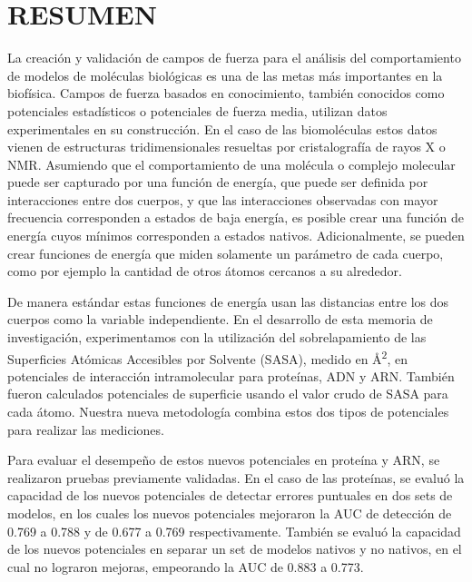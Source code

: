 \newpage
\section*{RESUMEN}
\begin{singlespace}
\par
La creación y validación de campos de fuerza para el análisis del comportamiento de 
modelos de moléculas biológicas es una de las metas más importantes en la biofísica. 
Campos de fuerza basados en conocimiento, también conocidos como potenciales 
estadísticos o potenciales de fuerza media, utilizan datos experimentales en su construcción. 
En el caso de las biomoléculas estos datos vienen de estructuras tridimensionales 
resueltas por cristalografía de rayos X o NMR.
Asumiendo que el comportamiento de una molécula o complejo molecular puede ser capturado por una 
función de energía, que puede ser definida por interacciones entre dos cuerpos, y que las 
interacciones observadas con mayor frecuencia corresponden a estados de baja energía, es posible 
crear una función de energía cuyos mínimos corresponden a estados nativos.
Adicionalmente, se pueden crear funciones de energía que miden solamente un parámetro de cada 
cuerpo, como por ejemplo la cantidad de otros átomos cercanos a su alrededor.
\\
\par
De manera estándar estas funciones de energía usan las distancias entre los dos cuerpos como la variable 
independiente. 
En el desarrollo de esta memoria de investigación, experimentamos con la utilización 
del sobrelapamiento de las Superficies Atómicas Accesibles por Solvente (SASA), medido en 
\si{\angstrom}\textsuperscript{2}, en potenciales de interacción intramolecular para proteínas, ADN y ARN. 
También fueron calculados potenciales de superficie usando el valor crudo de SASA para cada átomo.
Nuestra nueva metodología combina estos dos tipos de potenciales para realizar las mediciones.
\\
\par
Para evaluar el desempeño de estos nuevos potenciales en proteína y ARN, se realizaron pruebas 
previamente validadas. 
En el caso de las proteínas, se evaluó la capacidad de los nuevos potenciales de detectar 
errores puntuales en dos sets de modelos, en los cuales los nuevos potenciales mejoraron la 
AUC de detección de 0.769 a 0.788 y de 0.677 a 0.769 respectivamente. 
También se evaluó la capacidad de los nuevos potenciales en separar un set de modelos nativos y no 
nativos, en el cual no lograron mejoras, empeorando la AUC de 0.883 a 0.773. 

\end{singlespace}
